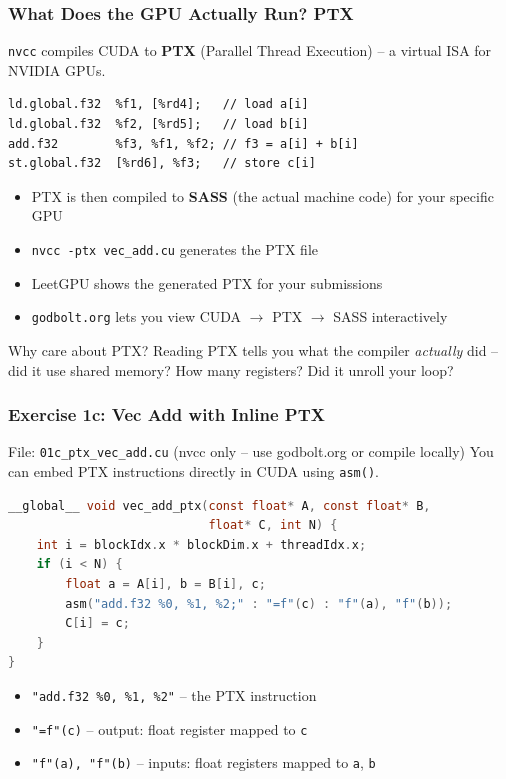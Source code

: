\documentclass[aspectratio=169]{beamer}
\begin{document}
\begin{frame}[fragile]
	\frametitle{What Does the GPU Actually Run? PTX}
	\texttt{nvcc} compiles CUDA to \textbf{PTX} (Parallel Thread Execution) -- a virtual ISA for NVIDIA GPUs.
	\begin{lstlisting}[title={\color{codegreen}PTX for c[i] = a[i] + b[i] (simplified)}]
ld.global.f32  %f1, [%rd4];   // load a[i]
ld.global.f32  %f2, [%rd5];   // load b[i]
add.f32        %f3, %f1, %f2; // f3 = a[i] + b[i]
st.global.f32  [%rd6], %f3;   // store c[i]
	\end{lstlisting}
	\vspace{0.3em}
	\begin{itemize}
		\item PTX is then compiled to \textbf{SASS} (the actual machine code) for your specific GPU
		\item \texttt{nvcc -ptx vec\_add.cu} generates the PTX file
		\item LeetGPU shows the generated PTX for your submissions
		\item \texttt{godbolt.org} lets you view CUDA $\rightarrow$ PTX $\rightarrow$ SASS interactively
	\end{itemize}
	\vspace{0.3em}
	\begin{block}{Why care about PTX?}
		Reading PTX tells you what the compiler \textit{actually} did -- did it use shared memory? How many registers? Did it unroll your loop?
	\end{block}
\end{frame}

\begin{frame}[fragile]
	\frametitle{Exercise 1c: Vec Add with Inline PTX}
	\begin{block}{File: \texttt{01c\_ptx\_vec\_add.cu} {\normalfont\textcolor{dimtext}{(nvcc only -- use godbolt.org or compile locally)}}}
		You can embed PTX instructions directly in CUDA using \texttt{asm()}.
	\end{block}
	\vspace{0.3em}
	\begin{lstlisting}[language=C]
__global__ void vec_add_ptx(const float* A, const float* B,
                            float* C, int N) {
    int i = blockIdx.x * blockDim.x + threadIdx.x;
    if (i < N) {
        float a = A[i], b = B[i], c;
        asm("add.f32 %0, %1, %2;" : "=f"(c) : "f"(a), "f"(b));
        C[i] = c;
    }
}
	\end{lstlisting}
	\vspace{0.3em}
	\begin{itemize}
		\item \texttt{"add.f32 \%0, \%1, \%2"} -- the PTX instruction
		\item \texttt{"=f"(c)} -- output: float register mapped to \texttt{c}
		\item \texttt{"f"(a), "f"(b)} -- inputs: float registers mapped to \texttt{a}, \texttt{b}
	\end{itemize}
\end{frame}
\end{document}
